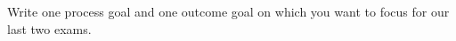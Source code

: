 %
%

\noindent{}Write one process goal and one outcome goal on which you want to focus for our last two exams.